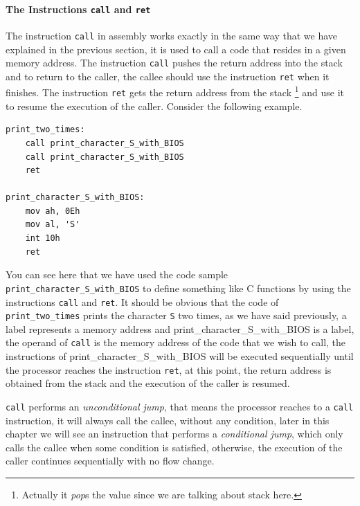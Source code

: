 \paragraph{\texorpdfstring{The Instructions \texttt{call} and
\texttt{ret}}{The Instructions call and ret}}\label{the-instructions-call-and-ret}

The instruction \lstinline!call! in assembly works exactly in the same
way that we have explained in the previous section, it is used to call a
code that resides in a given memory address. The instruction
\lstinline!call! pushes the return address into the stack and to return
to the caller, the callee should use the instruction \lstinline!ret!
when it finishes. The instruction \lstinline!ret! gets the return
address from the stack \footnote{Actually it \emph{pop}s the value since
  we are talking about stack here.} and use it to resume the execution
of the caller. Consider the following example.

\begin{lstlisting}
print_two_times:
    call print_character_S_with_BIOS
    call print_character_S_with_BIOS
    ret

print_character_S_with_BIOS:
    mov ah, 0Eh
    mov al, 'S'
    int 10h
    ret
\end{lstlisting}

You can see here that we have used the code sample
\texttt{print\_character\_S\_with\_BIOS} to define something like C
functions by using the instructions \lstinline!call! and
\lstinline!ret!. It should be obvious that the code of
\lstinline!print_two_times! prints the character \lstinline!S! two
times, as we have said previously, a label represents a memory address
and print\_character\_S\_with\_BIOS is a label, the operand of
\lstinline!call! is the memory address of the code that we wish to call,
the instructions of print\_character\_S\_with\_BIOS will be executed
sequentially until the processor reaches the instruction
\lstinline!ret!, at this point, the return address is obtained from the
stack and the execution of the caller is resumed.

\lstinline!call! performs an \emph{unconditional jump}, that means the
processor reaches to a \lstinline!call! instruction, it will always call
the callee, without any condition, later in this chapter we will see an
instruction that performs a \emph{conditional jump}, which only calls
the callee when some condition is satisfied, otherwise, the execution of
the caller continues sequentially with no flow change.

